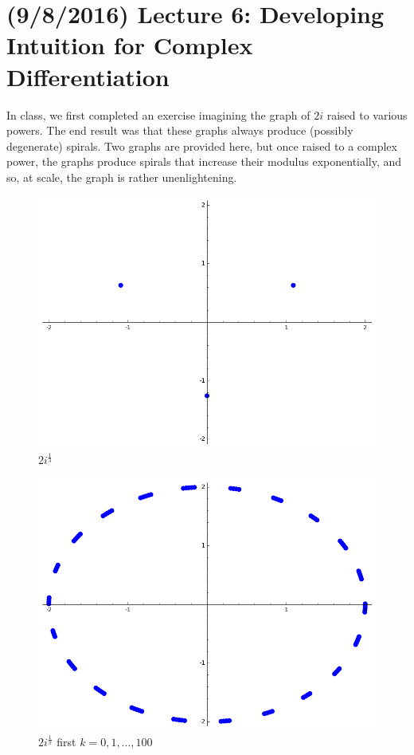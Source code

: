\documentclass[11pt,leqno,oneside]{amsart}
\begin{document}
    \section{(9/8/2016) Lecture 6: Developing Intuition for Complex Differentiation}
    In class, we first completed an exercise imagining the graph of $2i$
    raised to various powers. The end result was that these graphs always
    produce (possibly degenerate) spirals. Two graphs are provided here,
    but once raised to a complex power, the graphs produce spirals that
    increase their modulus exponentially, and so, at scale, the graph is rather
    unenlightening.

    \begin{figure}[h]
        \centering
        \includegraphics[scale=0.2]{images/2i-to-one-third.png}
        \caption{$2i^{\frac{1}{3}}$}
        \label{fig:2i13}
    \end{figure}
    \begin{figure}[h]
        \centering
        \includegraphics[scale=0.2]{images/2i-to-1-over-pi.png}
        \caption{$2i^{\frac{1}{\pi}}$ first $k = 0,1, \ldots, 100$}
        \label{fig:2i1pi}
    \end{figure}
\end{document}
